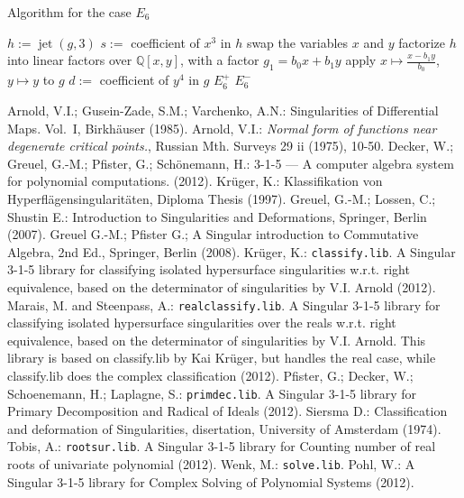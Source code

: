 \documentclass[noend]{amsproc}
\DeclareMathOperator{\m}{\mathfrak{m}}
\DeclareMathOperator{\jt}{jet}
\begin{document}
\begin{algorithm}[h]
\caption{\label{alg:E_6}\label{E[6]} Algorithm for the case $E_6$}
\begin{algorithmic}[1]

\REQUIRE{$g\in \m^3\subset\mathbb Q[x,y]$ of complex singularity type $E_6$}
\STATE $h:= \jt(g,3)$
\STATE $s:=$ coefficient of ${x^3}$ in $h$
\STATE swap the variables $x$ and $y$
\ENDIF
\STATE factorize $h$ into linear factors over $\mathbb Q[x,y]$, with a factor
$g_1=b_0x+b_1y$
\STATE apply $x\mapsto \frac{x-b_1y}{b_0}$, $y\mapsto y$ to $g$
\STATE $d :=$ coefficient of $y^4$ in $g$
\RETURN $E_6^+$
\ELSE
\RETURN $E_6^-$
\ENDIF

\end{algorithmic}
\end{algorithm}


 \begin{thebibliography}{99}
 Arnold, V.I.; Gusein-Zade, S.M.; Varchenko, A.N.:
Singularities of Differential Maps. Vol.~I, Birkh\"auser (1985).
 Arnold, V.I.:
\textit{Normal form of functions near degenerate critical points.},
Russian Mth. Surveys 29 ii (1975), 10-50.
Decker, W.; Greuel, G.-M.; Pfister, G.; Sch{\"o}nemann, H.:
 {3-1-5} --- {A} computer algebra system for polynomial
computations.
 (2012).
 Kr\"uger, K.: Klassifikation von
Hyperfl\"agensingularit\"aten, Diploma Thesis (1997).
Greuel, G.-M.; Lossen, C.; Shustin E.:
Introduction to Singularities and Deformations, Springer, Berlin (2007).
 Greuel G.-M.; Pfister G.;
A Singular introduction to Commutative Algebra, 2nd Ed., Springer,
Berlin (2008).
Kr\"uger, K.:
{\tt classify.lib}. {A} {\sc Singular} {3-1-5} library for classifying isolated
hypersurface singularities w.r.t. right equivalence, based on the determinator
of singularities by V.I. Arnold (2012).
Marais, M. and Steenpass, A.:
{\tt realclassify.lib}. {A} {\sc Singular} {3-1-5} library for classifying
isolated hypersurface singularities over the reals w.r.t. right equivalence,
based on the determinator of singularities by V.I. Arnold. This library is
based on classify.lib by Kai Kr\"uger, but handles the real case, while
classify.lib does the complex classification (2012).
 Pfister, G.; Decker, W.;  Schoenemann, H.; Laplagne, S.:
{\tt primdec.lib}. {A} {\sc Singular} {3-1-5} library for Primary Decomposition
and Radical of Ideals (2012).
 Siersma D.: Classification and deformation of Singularities,
disertation, University of Amsterdam (1974).
Tobis, A.:
{\tt rootsur.lib}. {A} {\sc Singular} {3-1-5} library for Counting number of
real roots of univariate polynomial (2012).
 Wenk, M.: {\tt solve.lib}. Pohl, W.:
{A} {\sc Singular} {3-1-5} library for Complex Solving of Polynomial Systems
(2012).

\end{thebibliography}
\end{document}
